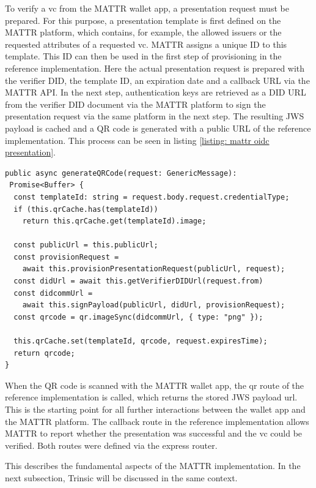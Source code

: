     To verify a \ac{vc} from the MATTR wallet app, a presentation request must be prepared. For this purpose, a presentation template is first defined on the MATTR platform, which contains, for example, the allowed issuers or the requested attributes of a requested \ac{vc}. MATTR assigns a unique ID to this template. This ID can then be used in the first step of provisioning in the reference implementation. Here the actual presentation request is prepared with the verifier DID, the template ID, an expiration date and a callback URL via the MATTR API. In the next step, authentication keys are retrieved as a DID URL from the verifier DID document via the MATTR platform to sign the presentation request via the same platform in the next step. The resulting JWS payload is cached and a QR code is generated with a public URL of the reference implementation. This process can be seen in listing \ref{listing: mattr oidc presentation}.
    \newline
\begin{lstlisting}[style=ES6, caption=Generate QR code for OIDC presentation reqest, label={listing: mattr oidc presentation}]
public async generateQRCode(request: GenericMessage): 
 Promise<Buffer> {
  const templateId: string = request.body.request.credentialType;
  if (this.qrCache.has(templateId)) 
    return this.qrCache.get(templateId).image;

  const publicUrl = this.publicUrl;
  const provisionRequest = 
    await this.provisionPresentationRequest(publicUrl, request);
  const didUrl = await this.getVerifierDIDUrl(request.from)
  const didcommUrl = 
    await this.signPayload(publicUrl, didUrl, provisionRequest); 
  const qrcode = qr.imageSync(didcommUrl, { type: "png" });

  this.qrCache.set(templateId, qrcode, request.expiresTime);
  return qrcode;
}\end{lstlisting}
    
    When the QR code is scanned with the MATTR wallet app, the qr route of the reference implementation is called, which returns the stored JWS payload url. This is the starting point for all further interactions between the wallet app and the MATTR platform. The callback route in the reference implementation allows MATTR to report whether the presentation was successful and the \ac{vc} could be verified. Both routes were defined via the express router.
    
    This describes the fundamental aspects of the MATTR implementation. In the next subsection, Trinsic will be discussed in the same context.
    \vfill
    
